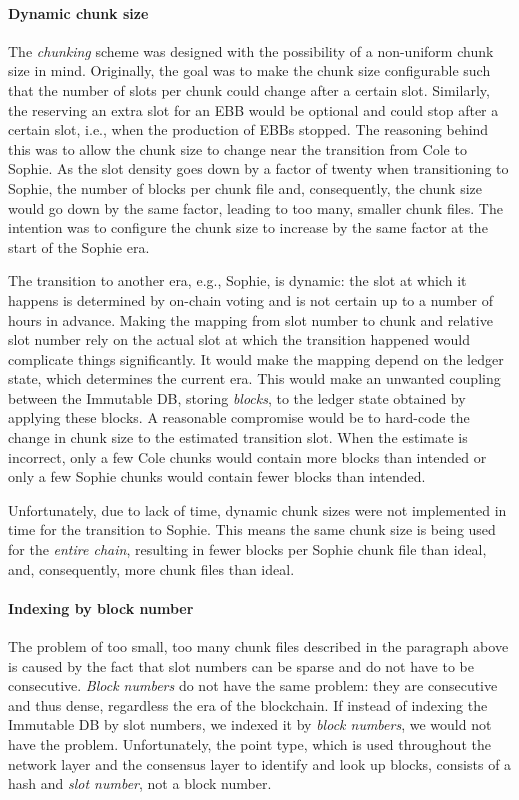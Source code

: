 \paragraph{Dynamic chunk size}

The \emph{chunking} scheme was designed with the possibility of a non-uniform
chunk size in mind. Originally, the goal was to make the chunk size configurable
such that the number of slots per chunk could change after a certain slot.
Similarly, the reserving an extra slot for an EBB would be optional and could
stop after a certain slot, i.e., when the production of EBBs stopped. The
reasoning behind this was to allow the chunk size to change near the transition
from Cole to Sophie. As the slot density goes down by a factor of twenty when
transitioning to Sophie, the number of blocks per chunk file and, consequently,
the chunk size would go down by the same factor, leading to too many, smaller
chunk files. The intention was to configure the chunk size to increase by the
same factor at the start of the Sophie era.

The transition to another era, e.g., Sophie, is dynamic: the slot at which it
happens is determined by on-chain voting and is not certain up to a number of
hours in advance. Making the mapping from slot number to chunk and relative slot
number rely on the actual slot at which the transition happened would complicate
things significantly. It would make the mapping depend on the ledger state,
which determines the current era. This would make an unwanted coupling between
the Immutable DB, storing \emph{blocks}, to the ledger state obtained by
applying these blocks. A reasonable compromise would be to hard-code the change
in chunk size to the estimated transition slot. When the estimate is incorrect,
only a few Cole chunks would contain more blocks than intended or only a few
Sophie chunks would contain fewer blocks than intended.

Unfortunately, due to lack of time, dynamic chunk sizes were not implemented in
time for the transition to Sophie. This means the same chunk size is being used
for the \emph{entire chain}, resulting in fewer blocks per Sophie chunk file
than ideal, and, consequently, more chunk files than ideal.

\paragraph{Indexing by block number}

The problem of too small, too many chunk files described in the paragraph above
is caused by the fact that slot numbers can be sparse and do not have to be
consecutive. \emph{Block numbers} do not have the same problem: they are
consecutive and thus dense, regardless the era of the blockchain. If instead of
indexing the Immutable DB by slot numbers, we indexed it by \emph{block
numbers}, we would not have the problem. Unfortunately, the point type, which is
used throughout the network layer and the consensus layer to identify and look
up blocks, consists of a hash and \emph{slot number}, not a block number.

